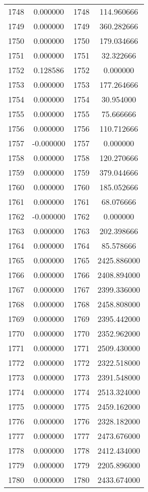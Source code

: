 \documentclass[12pt]{article}
\begin{document}
\begin{longtable}{@{}cccc@{}}
1748 & 0.000000 & 1748 & 114.960666 \\
1749 & 0.000000 & 1749 & 360.282666 \\
1750 & 0.000000 & 1750 & 179.034666 \\
1751 & 0.000000 & 1751 & 32.322666 \\
1752 & 0.128586 & 1752 & 0.000000 \\
1753 & 0.000000 & 1753 & 177.264666 \\
1754 & 0.000000 & 1754 & 30.954000 \\
1755 & 0.000000 & 1755 & 75.666666 \\
1756 & 0.000000 & 1756 & 110.712666 \\
1757 & -0.000000 & 1757 & 0.000000 \\
1758 & 0.000000 & 1758 & 120.270666 \\
1759 & 0.000000 & 1759 & 379.044666 \\
1760 & 0.000000 & 1760 & 185.052666 \\
1761 & 0.000000 & 1761 & 68.076666 \\
1762 & -0.000000 & 1762 & 0.000000 \\
1763 & 0.000000 & 1763 & 202.398666 \\
1764 & 0.000000 & 1764 & 85.578666 \\
1765 & 0.000000 & 1765 & 2425.886000 \\
1766 & 0.000000 & 1766 & 2408.894000 \\
1767 & 0.000000 & 1767 & 2399.336000 \\
1768 & 0.000000 & 1768 & 2458.808000 \\
1769 & 0.000000 & 1769 & 2395.442000 \\
1770 & 0.000000 & 1770 & 2352.962000 \\
1771 & 0.000000 & 1771 & 2509.430000 \\
1772 & 0.000000 & 1772 & 2322.518000 \\
1773 & 0.000000 & 1773 & 2391.548000 \\
1774 & 0.000000 & 1774 & 2513.324000 \\
1775 & 0.000000 & 1775 & 2459.162000 \\
1776 & 0.000000 & 1776 & 2328.182000 \\
1777 & 0.000000 & 1777 & 2473.676000 \\
1778 & 0.000000 & 1778 & 2412.434000 \\
1779 & 0.000000 & 1779 & 2205.896000 \\
1780 & 0.000000 & 1780 & 2433.674000 \\

\end{longtable}
\end{document}
